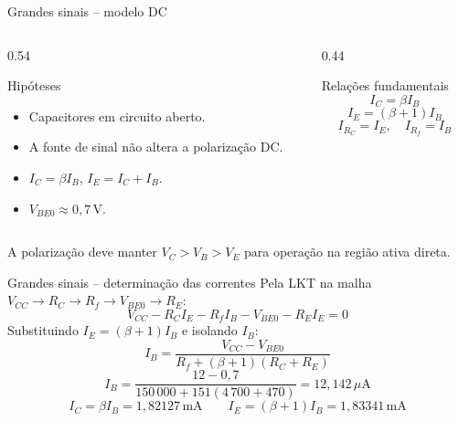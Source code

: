 \documentclass[aspectratio=169,11pt]{beamer}
\begin{document}
\begin{frame}{Grandes sinais -- modelo DC}
  \begin{columns}[T,onlytextwidth]
    \begin{column}{0.54\textwidth}
      \begin{block}{Hipóteses}
        \begin{itemize}\small
          \item Capacitores em circuito aberto.
          \item A fonte de sinal não altera a polarização DC.
          \item $I_C=\beta I_B$, $I_E=I_C+I_B$.
          \item $V_{BE0}\approx0{,}7\,\mathrm{V}$.
        \end{itemize}
      \end{block}
    \end{column}
    \begin{column}{0.44\textwidth}
      \begin{block}{Relações fundamentais}
        \[
        I_C=\beta I_B
        \]
        \[
        I_E=(\beta+1)I_B
        \]
        \[
        I_{R_C}=I_E,\quad I_{R_f}=I_B
        \]
      \end{block}
    \end{column}
  \end{columns}
  \vspace{0.2cm}
  \centering\small A polarização deve manter $V_C>V_B>V_E$ para operação na região ativa direta.
\end{frame}



\begin{frame}{Grandes sinais -- determinação das correntes}
  \small
  Pela LKT na malha $V_{CC}\!\to\!R_C\!\to\!R_f\!\to\!V_{BE0}\!\to\!R_E$:
  \[
    V_{CC} - R_C I_E - R_f I_B - V_{BE0} - R_E I_E=0
  \]
  Substituindo $I_E=(\beta+1)I_B$ e isolando $I_B$:
  \[
  \boxed{I_B=\frac{V_{CC}-V_{BE0}}{R_f+(\beta+1)(R_C+R_E)}}
  \]
  \[
  I_B=\frac{12-0{,}7}{150\,000+151(4\,700+470)}
  =\boxed{12{,}142\,\mu\mathrm A}
  \]
  \[
  I_C=\beta I_B=\boxed{1{,}82127\,\mathrm{mA}}\qquad
  I_E=(\beta+1)I_B=\boxed{1{,}83341\,\mathrm{mA}}
  \]
\end{frame}


\end{document}
